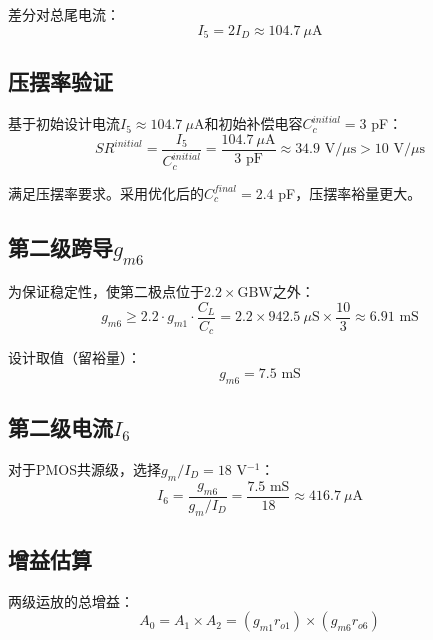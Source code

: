 \documentclass[UTF8,12pt,a4paper]{ctexart}
\begin{document}
差分对总尾电流：
\begin{equation}
I_5 = 2I_D \approx 104.7\ \mu\text{A}
\end{equation}

\subsection{压摆率验证}

基于初始设计电流$I_5 \approx 104.7\ \mu\text{A}$和初始补偿电容$C_c^{initial} = 3$ pF：
\begin{equation}
SR^{initial} = \frac{I_5}{C_c^{initial}} = \frac{104.7\ \mu\text{A}}{3\text{ pF}} \approx 34.9\text{ V/}\mu\text{s} > 10\text{ V/}\mu\text{s}
\end{equation}

满足压摆率要求。采用优化后的$C_c^{final} = 2.4$ pF，压摆率裕量更大。

\subsection{第二级跨导$g_{m6}$}

为保证稳定性，使第二极点位于$2.2 \times \text{GBW}$之外：
\begin{equation}
g_{m6} \geq 2.2 \cdot g_{m1} \cdot \frac{C_L}{C_c} = 2.2 \times 942.5\ \mu\text{S} \times \frac{10}{3} \approx 6.91\text{ mS}
\end{equation}

设计取值（留裕量）：
\begin{equation}
g_{m6} = 7.5\text{ mS}
\end{equation}

\subsection{第二级电流$I_6$}

对于PMOS共源级，选择$g_m/I_D = 18$ V$^{-1}$：
\begin{equation}
I_6 = \frac{g_{m6}}{g_m/I_D} = \frac{7.5\text{ mS}}{18} \approx 416.7\ \mu\text{A}
\end{equation}

\subsection{增益估算}

两级运放的总增益：
\begin{equation}
A_0 = A_1 \times A_2 = (g_{m1} r_{o1}) \times (g_{m6} r_{o6})
\end{equation}
\end{document}
